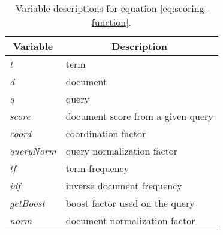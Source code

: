 \begin{table}
		\centering
    \begin{tabular}{|l|l|}
    \hline
		\multicolumn{1}{|c|}{\bfseries Variable} & \multicolumn{1}{c|}{\bfseries Description} \\ \hline
    \textit{t}         & term                           		\\ \hline
    \textit{d}         & document                       		\\ \hline
    \textit{q}         & query                          		\\ \hline
		\textit{score}     & document score from a given query	\\ \hline
    \textit{coord}     & coordination factor            		\\ \hline
    \textit{queryNorm} & query normalization factor     		\\ \hline
    \textit{tf}        & term frequency                 		\\ \hline
    \textit{idf}       & inverse document frequency     		\\ \hline
    \textit{getBoost}  & boost factor used on the query 		\\ \hline
    \textit{norm}      & document normalization factor  		\\ \hline
    \end{tabular}
		\caption{Variable descriptions for equation \ref{eq:scoring-function}.}
		\label{tbl:scoring-function}
\end{table}
